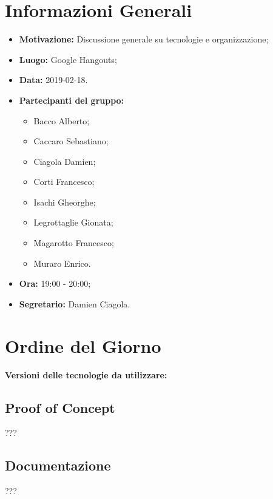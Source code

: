 \documentclass[a4paper, oneside, openany, dvipsnames, table]{article}
\begin{document}
\copertina{}


\newpage
\tableofcontents
\newpage
\section{Informazioni Generali}
\begin{itemize}
\item \textbf{Motivazione:} Discussione generale su tecnologie e organizzazione;
\item \textbf{Luogo:} Google Hangouts;
\item \textbf{Data:} 2019-02-18.
\item \textbf{Partecipanti del gruppo:} \hfill
	\begin{itemize}
	\item Bacco Alberto;
	\item Caccaro Sebastiano;
	\item Ciagola Damien;
	\item Corti Francesco;
	\item Isachi Gheorghe;
	\item Legrottaglie Gionata;
	\item Magarotto Francesco;
	\item Muraro Enrico.
	\end{itemize} 
\item \textbf{Ora:} 19:00 - 20:00;
\item \textbf{Segretario:} Damien Ciagola.
\end{itemize}

\section{Ordine del Giorno}
\item \textbf{Versioni delle tecnologie da utilizzare:}


\subsection{Proof of Concept}
???
	
\subsection{Documentazione}
???
\end{document}
